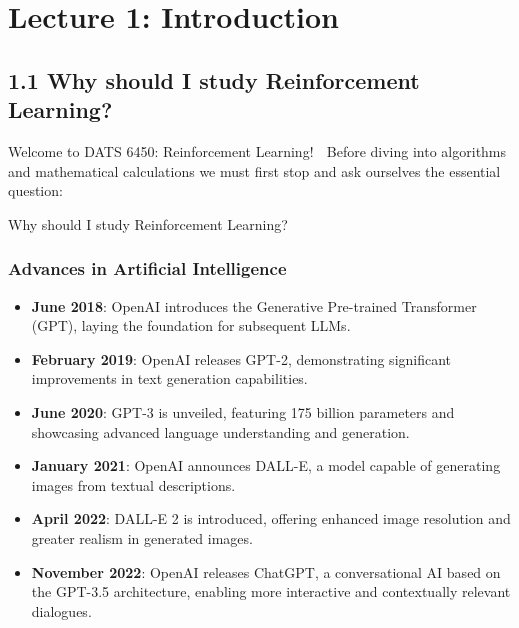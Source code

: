 \documentclass[
  letterpaper,
  DIV=11,
  numbers=noendperiod]{scrreprt}
\begin{document}
\part{Lecture 1: Introduction}

\chapter{1.1 Why should I study Reinforcement
Learning?}\label{why-should-i-study-reinforcement-learning}

\begin{tcolorbox}[enhanced jigsaw, arc=.35mm, toprule=.15mm, leftrule=.75mm, colback=white, left=2mm, colframe=quarto-callout-note-color-frame, rightrule=.15mm, opacityback=0, breakable, bottomrule=.15mm]

Welcome to DATS 6450: Reinforcement Learning! 🚀 Before diving into
algorithms and mathematical calculations we must first stop and ask
ourselves the essential question:

Why should I study Reinforcement Learning? 🤔

\end{tcolorbox}

\section{Advances in Artificial
Intelligence}\label{advances-in-artificial-intelligence}

\begin{itemize}
\item
  \textbf{June 2018}: OpenAI introduces the Generative Pre-trained
  Transformer (GPT), laying the foundation for subsequent LLMs.
\item
  \textbf{February 2019}: OpenAI releases GPT-2, demonstrating
  significant improvements in text generation capabilities.
\item
  \textbf{June 2020}: GPT-3 is unveiled, featuring 175 billion
  parameters and showcasing advanced language understanding and
  generation.
\item
  \textbf{January 2021}: OpenAI announces DALL-E, a model capable of
  generating images from textual descriptions.
\item
  \textbf{April 2022}: DALL-E 2 is introduced, offering enhanced image
  resolution and greater realism in generated images.
\item
  \textbf{November 2022}: OpenAI releases ChatGPT, a conversational AI
  based on the GPT-3.5 architecture, enabling more interactive and
  contextually relevant dialogues.
\end{itemize}
\end{document}
